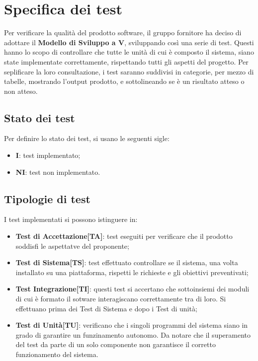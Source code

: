 \section{Specifica dei test}
Per verificare la qualità del prodotto software, il gruppo fornitore ha deciso di adottare il \textbf{Modello di Sviluppo a V}\glo, sviluppando così una serie di test. Questi hanno lo scopo di controllare che tutte le unità di cui è composto il sistema, siano state implementate correttamente, rispettando tutti gli aspetti del progetto.
Per seplificare la loro consultazione, i test saranno suddivisi in categorie, per mezzo di tabelle, mostrando l'output prodotto, e sottolineando se è un risultato atteso o non atteso.
\subsection{Stato dei test}
Per definire lo stato dei test, si usano le seguenti sigle:
\begin{itemize}
\item \textbf{I}: test implementato;
\item \textbf{NI}: test non implementato.
\end{itemize}
\subsection{Tipologie di test}
I test implementati si possono istinguere in:
\begin{itemize}
\item \textbf{Test di Accettazione[TA]}: test eseguiti per verificare che il prodotto soddisfi le aspettatve del proponente;
\item \textbf{Test di Sistema[TS]}: test effettuato controllare se il sistema, una volta installato su una piattaforma, rispetti le richieste e gli obiettivi  preventivati;
\item \textbf{Test Integrazione[TI]}: questi test si accertano che sottoinsiemi dei moduli di cui è formato il sotware interagiscano correttamente tra di loro. Si effettuano prima dei Test di Sistema e dopo i Test di unità;
\item \textbf{Test di Unità[TU]}: verificano che i singoli programmi del sistema siano in grado di garantire un funzinamento autonomo. Da notare che il superamento del test da parte di un solo componente non garantisce il corretto funzionamento del sistema.
\end{itemize}
